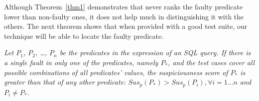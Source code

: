 \newtheorem{lemma}{Lemma}
\newtheorem{corollary}{Corollary}



Although Theorem~\ref{thm1} demonstrates that \tool{} never ranks the
faulty predicate lower than non-faulty ones, it does not help much in
distinguishing it with the others. The next theorem shows that when
provided with a good test suite, our technique will be able to locate
the faulty predicate.

\begin{theorem}
\label{thm2}
{\em Let $P_1$, $P_2$, \ldots, $P_n$ be the predicates in the 
expression of an SQL query. If there is a single fault in only one of
the predicates, namely $P_*$, and the test cases cover all possible
combinations of all predicates' values, the suspiciousness score of
$P_*$ is greater than that of any other predicate: $Sus_p(P_*) >
Sus_p(P_i), \forall i = 1 \ldots n$ and $P_i \neq P_*$.}
\end{theorem}

